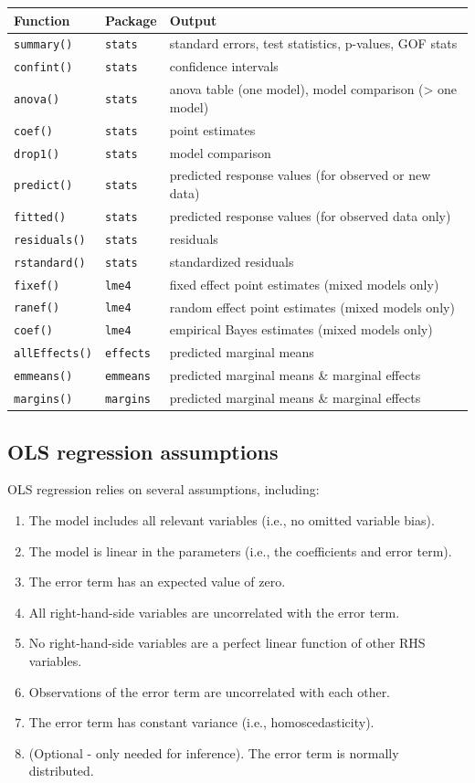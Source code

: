\documentclass[
]{book}
\providecommand{\tightlist}{%
  \setlength{\itemsep}{0pt}\setlength{\parskip}{0pt}}
\begin{document}
\begin{longtable}[]{@{}lll@{}}
\toprule
Function & Package & Output\tabularnewline
\midrule
\endhead
\texttt{summary()} & \texttt{stats} & standard errors, test statistics, p-values, GOF stats\tabularnewline
\texttt{confint()} & \texttt{stats} & confidence intervals\tabularnewline
\texttt{anova()} & \texttt{stats} & anova table (one model), model comparison (\textgreater{} one model)\tabularnewline
\texttt{coef()} & \texttt{stats} & point estimates\tabularnewline
\texttt{drop1()} & \texttt{stats} & model comparison\tabularnewline
\texttt{predict()} & \texttt{stats} & predicted response values (for observed or new data)\tabularnewline
\texttt{fitted()} & \texttt{stats} & predicted response values (for observed data only)\tabularnewline
\texttt{residuals()} & \texttt{stats} & residuals\tabularnewline
\texttt{rstandard()} & \texttt{stats} & standardized residuals\tabularnewline
\texttt{fixef()} & \texttt{lme4} & fixed effect point estimates (mixed models only)\tabularnewline
\texttt{ranef()} & \texttt{lme4} & random effect point estimates (mixed models only)\tabularnewline
\texttt{coef()} & \texttt{lme4} & empirical Bayes estimates (mixed models only)\tabularnewline
\texttt{allEffects()} & \texttt{effects} & predicted marginal means\tabularnewline
\texttt{emmeans()} & \texttt{emmeans} & predicted marginal means \& marginal effects\tabularnewline
\texttt{margins()} & \texttt{margins} & predicted marginal means \& marginal effects\tabularnewline
\bottomrule
\end{longtable}

\hypertarget{ols-regression-assumptions}{%
\subsection{OLS regression assumptions}\label{ols-regression-assumptions}}

OLS regression relies on several assumptions, including:

\begin{enumerate}
\def\labelenumi{\arabic{enumi}.}
\tightlist
\item
  The model includes all relevant variables (i.e., no omitted variable bias).
\item
  The model is linear in the parameters (i.e., the coefficients and error term).
\item
  The error term has an expected value of zero.
\item
  All right-hand-side variables are uncorrelated with the error term.
\item
  No right-hand-side variables are a perfect linear function of other RHS variables.
\item
  Observations of the error term are uncorrelated with each other.
\item
  The error term has constant variance (i.e., homoscedasticity).
\item
  (Optional - only needed for inference). The error term is normally distributed.
\end{enumerate}
\end{document}
